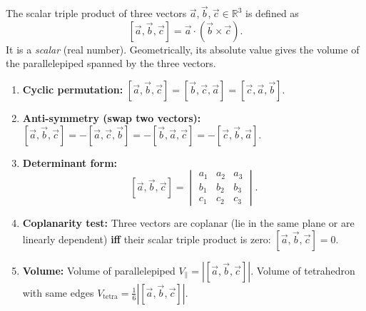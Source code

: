 \documentclass[11pt]{article}
\newcommand{\cle}[1]{{\popxbold\color{popdark}#1}}
\begin{document}
\begin{definition}
The \cle{scalar triple product} of three vectors $\vec{a},\vec{b},\vec{c}\in\mathbb{R}^3$ is defined as
\[
[\vec{a},\vec{b},\vec{c}] = \vec{a}\cdot(\vec{b}\times\vec{c}).
\]
It is a \emph{scalar} (real number). Geometrically, its absolute value gives the volume of the parallelepiped spanned by the three vectors.
\end{definition}

\begin{propriete}
\begin{enumerate}
\item \textbf{Cyclic permutation:} $[\vec{a},\vec{b},\vec{c}] = [\vec{b},\vec{c},\vec{a}] = [\vec{c},\vec{a},\vec{b}]$.
\item \textbf{Anti-symmetry (swap two vectors):} $[\vec{a},\vec{b},\vec{c}] = -[\vec{a},\vec{c},\vec{b}] = -[\vec{b},\vec{a},\vec{c}] = -[\vec{c},\vec{b},\vec{a}]$.
\item \textbf{Determinant form:}
\[
[\vec{a},\vec{b},\vec{c}] =
\begin{vmatrix}
a_1 & a_2 & a_3 \\
b_1 & b_2 & b_3 \\
c_1 & c_2 & c_3
\end{vmatrix}.
\]
\item \textbf{Coplanarity test:} Three vectors are coplanar (lie in the same plane or are linearly dependent) \textbf{iff} their scalar triple product is zero: $[\vec{a},\vec{b},\vec{c}]=0$.
\item \textbf{Volume:} Volume of parallelepiped $V_{\parallel} = |[\vec{a},\vec{b},\vec{c}]|$.
Volume of tetrahedron with same edges $V_{\text{tetra}} = \frac{1}{6}|[\vec{a},\vec{b},\vec{c}]|$.
\end{enumerate}
\end{propriete}
\end{document}
